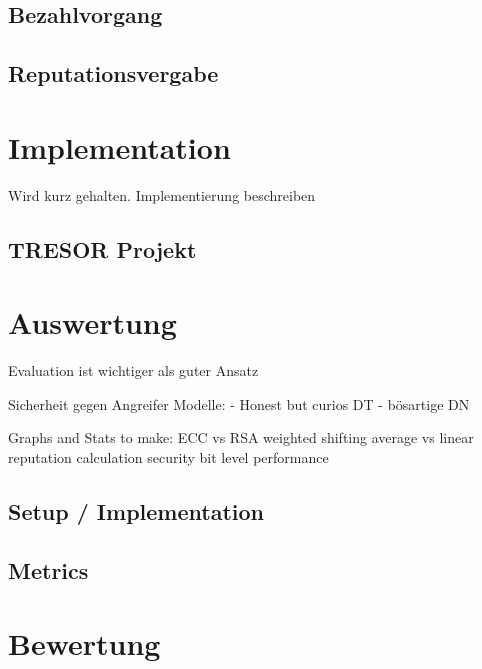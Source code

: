 \documentclass[11pt,a4paper]{scrreprt}
\begin{document}
\section{Bezahlvorgang}

\section{Reputationsvergabe}




\chapter{Implementation}
Wird kurz gehalten. Implementierung beschreiben

\section{TRESOR Projekt}


\chapter{Auswertung}
Evaluation ist wichtiger als guter Ansatz

Sicherheit gegen Angreifer Modelle:
    - Honest but curios DT
    - bösartige DN



Graphs and Stats to make:
ECC vs RSA
weighted shifting average vs linear reputation calculation
security bit level performance

\section{Setup / Implementation}

\section{Metrics}



\chapter{Bewertung}
\end{document}
